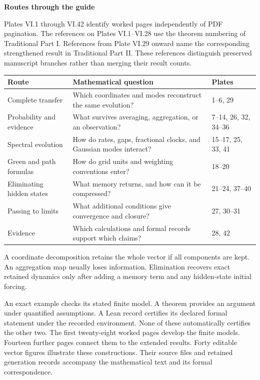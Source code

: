 
{\sffamily\bfseries\Large\color{accent}Routes through the guide\par}\vspace{12pt}
Plates VI.1 through VI.42 identify worked pages independently of PDF pagination. The references on Plates VI.1--VI.28 use the theorem numbering of Traditional Part I. References from Plate VI.29 onward name the corresponding strengthened result in Traditional Part II. These references distinguish preserved manuscript branches rather than merging their result counts.
\begin{center}\small
\begin{tabularx}{\linewidth}{@{}p{1.6in}Yl@{}}\toprule
Route & Mathematical question & Plates\\\midrule
Complete transfer & Which coordinates and modes reconstruct the same evolution? & 1--6, 29\\
Probability and evidence & What survives averaging, aggregation, or an observation? & 7--14, 26, 32, 34--36\\
Spectral evolution & How do rates, gaps, fractional clocks, and Gaussian modes interact? & 15--17, 25, 33, 41\\
Green and path formulas & How do grid units and weighting conventions enter? & 18--20\\
Eliminating hidden states & What memory returns, and how can it be compressed? & 21--24, 37--40\\
Passing to limits & What additional conditions give convergence and closure? & 27, 30--31\\
Evidence & Which calculations and formal records support which claims? & 28, 42\\\bottomrule
\end{tabularx}
\end{center}
A coordinate decomposition retains the whole vector if all components are kept. An aggregation map usually loses information. Elimination recovers exact retained dynamics only after adding a memory term and any hidden-state initial forcing.

An exact example checks its stated finite model. A theorem provides an argument under quantified assumptions. A Lean record certifies its declared formal statement under the recorded environment. None of these automatically certifies the other two.
The first twenty-eight worked pages develop the finite models. Fourteen further pages connect them to the extended results. Forty editable vector figures illustrate these constructions. Their source files and retained generation records accompany the mathematical text and its formal correspondence.

